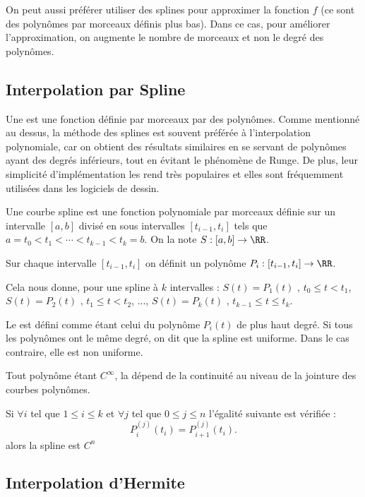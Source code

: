On peut aussi préférer utiliser des splines pour approximer la fonction $f$ (ce sont des polynômes 
par morceaux définis plus bas). Dans ce cas, pour améliorer l'approximation, on augmente le nombre de 
morceaux et non le degré des polynômes.


\medskip
\subsection{Interpolation par Spline}

Une  est une fonction définie par morceaux par des polynômes.
Comme mentionné au dessus, la méthode des splines est souvent préférée à l'interpolation 
polynomiale, car on obtient des résultats similaires en se servant de polynômes ayant des degrés 
inférieurs, tout en évitant le phénomène de Runge.
De plus, leur simplicité d'implémentation les rend très populaires et elles sont fréquemment utilisées 
dans les logiciels de dessin.

\medskip
Une courbe spline est une fonction polynomiale par morceaux définie sur un intervalle $[a,b]$ divisé 
en sous intervalles $[t_{i-1}, t_i]$ tels que $a = t_0 < t_1 < \cdots < t_{k-1} < t_k = b$. On la note 
$S: [a,b]\to \RR$.

Sur chaque intervalle $[t_{i-1}, t_i]$ on définit un polynôme
$ P_i: [t_{i-1}, t_i] \to \RR$.

Cela nous donne, pour une spline à $k$ intervalles :
$S(t) = P_1 (t) \mbox{ , } t_0 \le t < t_1$, $S(t) = P_2 (t) \mbox{ , } t_1 \le t < t_2$, ..., 
$S(t) = P_k (t) \mbox{ , } t_{k-1} \le t \le t_k$.

\medskip
Le  est défini comme étant celui du polynôme $P_i (t)$ de plus haut 
degré. Si tous les polynômes ont le même degré, on dit que la spline est uniforme. Dans le cas contraire, 
elle est non uniforme.

\medskip
Tout polynôme étant $C^\infty$, la  dépend de la continuité 
au niveau de la jointure des courbes polynômes.

Si $\forall i$ tel que $1 \le i \le k$ et $\forall j$ tel que $0 \le j \le n$ l'égalité suivante est vérifiée :
\begin{equation}
    P_i^{(j)} (t_i) = P_{i+1}^{(j)} (t_i).
\end{equation}
alors la spline est $C^n$


\medskip
\subsection{Interpolation d'Hermite}

